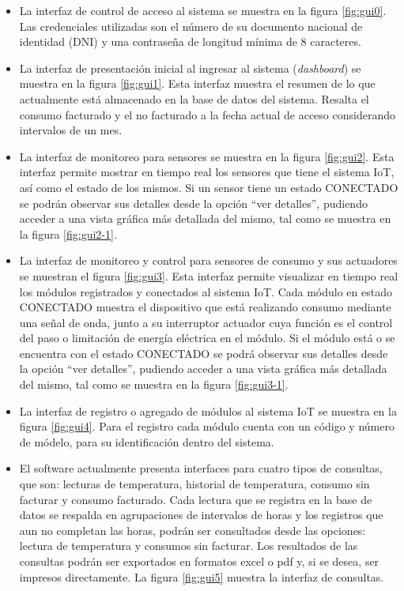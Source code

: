 \begin{itemize}
\item La interfaz de control de acceso al sistema se muestra en la figura \ref{fig:gui0}. Las credenciales utilizadas son el número de su documento nacional de identidad (DNI) y una contraseña de longitud mínima de 8 caracteres.

\item La interfaz de presentación inicial al ingresar al sistema (\emph{dashboard}) se muestra en la figura \ref{fig:gui1}. Esta interfaz muestra el resumen de lo que actualmente está almacenado en la base de datos del sistema. Resalta el consumo facturado y el no facturado a la fecha actual de acceso considerando intervalos de un mes.

\item La interfaz de monitoreo para sensores se muestra en la figura \ref{fig:gui2}. Esta interfaz permite mostrar en tiempo real los sensores que tiene el sistema IoT, así como el estado de los mismos. Si un sensor tiene un estado CONECTADO se podrán observar sus detalles desde la opción ``ver detalles'', pudiendo acceder a una vista gráfica más detallada del mismo, tal como se muestra en la figura \ref{fig:gui2-1}.

\item La interfaz de monitoreo y control para sensores de consumo y sus actuadores se muestran el figura \ref{fig:gui3}. Esta interfaz permite visualizar en tiempo real los módulos registrados y conectados al sistema IoT. Cada módulo en estado CONECTADO muestra el dispositivo que está realizando consumo mediante una señal de onda, junto a su interruptor actuador cuya función es el control del paso o limitación de energía eléctrica en el módulo. Si el módulo está o se encuentra con el estado CONECTADO se podrá observar sus detalles desde la opción ``ver detalles'', pudiendo acceder a una vista gráfica más detallada del mismo, tal como se muestra en la figura \ref{fig:gui3-1}.

\item La interfaz de registro o agregado de módulos al sistema IoT se muestra en la figura \ref{fig:gui4}. Para el registro cada módulo cuenta con un código y número de módelo, para su identificación dentro del sistema.

\item El software actualmente presenta interfaces para cuatro tipos de consultas, que son: lecturas de temperatura, historial de temperatura, consumo sin facturar y consumo facturado. Cada lectura que se registra en la base de datos se respalda en agrupaciones de intervalos de horas y los registros que aun no completan las horas, podrán ser consultados desde las opciones: lectura de temperatura y consumos sin facturar. Los resultados de las consultas podrán ser exportados en formatos excel o pdf y, si se desea, ser impresos directamente. La figura \ref{fig:gui5} muestra la interfaz de consultas.


\end{itemize}
